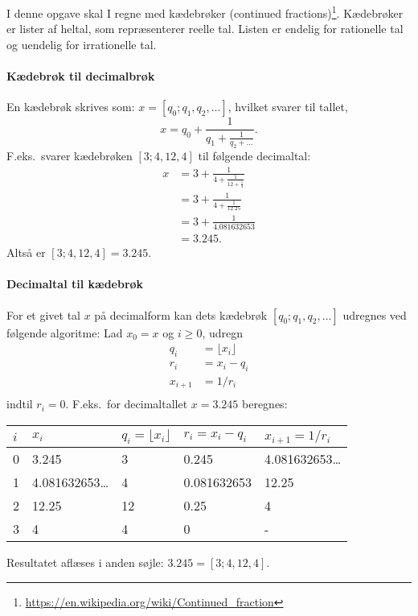 I denne opgave skal I regne med kædebrøker (continued
fractions)\footnote{\url{https://en.wikipedia.org/wiki/Continued_fraction}}. Kædebrøker
er lister af heltal, som repræsenterer reelle tal. Listen er endelig
for rationelle tal og uendelig for irrationelle tal. 

\paragraph{Kædebrøk til decimalbrøk}
En kædebrøk skrives som:
$x = [q_0; q_1, q_2, \ldots]$, hvilket svarer til tallet,
\begin{equation}
  x = q_0 + \frac{1}{q_1 + \frac{1}{q_2 + \dots}}.
\end{equation}
F.eks.\ svarer kædebrøken $[3;4, 12, 4]$ til følgende decimaltal:
\begin{align}
  x &= 3 + \frac{1}{4 + \frac{1}{12 + \frac{1}{4}}}
  \\&=  3 + \frac{1}{4 + \frac{1}{12.25}}
  \\&=  3 + \frac{1}{4.081632653}
  \\&=  3.245.
\end{align}
Altså er $[3;4, 12, 4] = 3.245$.

\paragraph{Decimaltal til kædebrøk}
For et givet tal $x$ på decimalform kan dets kædebrøk
$[q_0; q_1, q_2, \ldots]$ udregnes ved følgende algoritme: Lad
$x_0 = x$ og $i \geq 0$, udregn
\begin{align}
q_i &= \lfloor x_i \rfloor\\
r_i &= x_i - q_i\\
x_{i+1} &= 1/r_i\\
\end{align}
indtil $r_i = 0$. F.eks.\ for decimaltallet $x=3.245$ beregnes:
\begin{center}
  \begin{tabular}{|l|l|l|l|l|}
    \hline
    $i$ & $x_i$ & $q_i = \lfloor x_i \rfloor$ & $r_i = x_i - q_i$ & $x_{i+1}=1/r_i$\\
    \hline
    0 & 3.245 & 3 & 0.245 & 4.081632653\ldots\\
    1 & 4.081632653\ldots & 4 & 0.081632653 & 12.25\\
    2 & 12.25 & 12 & 0.25 & 4\\
    3 & 4 & 4 & 0 & -\\
    \hline
  \end{tabular}
\end{center}
Resultatet aflæses i anden søjle: $3.245 = [3; 4, 12, 4]$.

